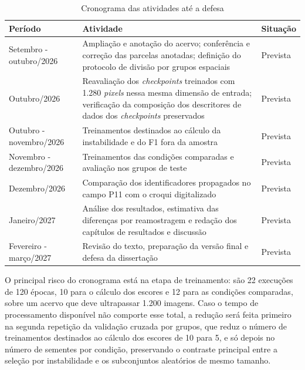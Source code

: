 \begin{table}[htb]
\centering
\caption{Cronograma das atividades at\'e a defesa}
\label{tab:cronograma-defesa}
\small
\begin{tabular}{p{3.4cm}p{8.4cm}p{1.8cm}}
\hline
\textbf{Per\'iodo} & \textbf{Atividade} & \textbf{Situa\c{c}\~ao} \\
\hline
Setembro - outubro/2026 & Amplia\c{c}\~ao e anota\c{c}\~ao do acervo; confer\^encia e corre\c{c}\~ao das parcelas anotadas; defini\c{c}\~ao do protocolo de divis\~ao por grupos espaciais & Prevista \\
Outubro/2026 & Reavalia\c{c}\~ao dos \textit{checkpoints} treinados com 1.280 \textit{pixels} nessa mesma dimens\~ao de entrada; verifica\c{c}\~ao da composi\c{c}\~ao dos descritores de dados dos \textit{checkpoints} preservados & Prevista \\
Outubro - novembro/2026 & Treinamentos destinados ao c\'alculo da instabilidade e do F1 fora da amostra & Prevista \\
Novembro - dezembro/2026 & Treinamentos das condi\c{c}\~oes comparadas e avalia\c{c}\~ao nos grupos de teste & Prevista \\
Dezembro/2026 & Compara\c{c}\~ao dos identificadores propagados no campo P11 com o croqui digitalizado & Prevista \\
Janeiro/2027 & An\'alise dos resultados, estimativa das diferen\c{c}as por reamostragem e reda\c{c}\~ao dos cap\'itulos de resultados e discuss\~ao & Prevista \\
Fevereiro - mar\c{c}o/2027 & Revis\~ao do texto, prepara\c{c}\~ao da vers\~ao final e defesa da disserta\c{c}\~ao & Prevista \\
\hline
\end{tabular}
\end{table}

O principal risco do cronograma est\'a na etapa de treinamento: s\~ao 22 execu\c{c}\~oes de 120 \'epocas, 10 para o c\'alculo dos escores e 12 para as condi\c{c}\~oes comparadas, sobre um acervo que deve ultrapassar 1.200 imagens. Caso o tempo de processamento dispon\'ivel n\~ao comporte esse total, a redu\c{c}\~ao ser\'a feita primeiro na segunda repeti\c{c}\~ao da valida\c{c}\~ao cruzada por grupos, que reduz o n\'umero de treinamentos destinados ao c\'alculo dos escores de 10 para 5, e s\'o depois no n\'umero de sementes por condi\c{c}\~ao, preservando o contraste principal entre a sele\c{c}\~ao por instabilidade e os subconjuntos aleat\'orios de mesmo tamanho.
